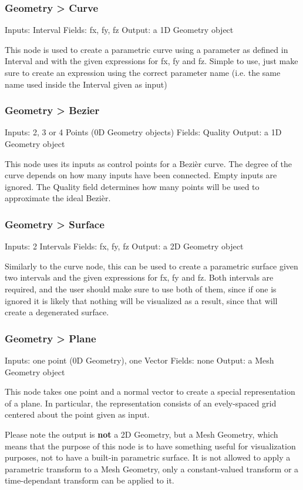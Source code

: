 \subsubsection{Geometry > Curve}
Inputs: Interval
Fields: fx, fy, fz
Output: a 1D Geometry object

This node is used to create a parametric curve using a parameter as defined in
Interval and with the given expressions for fx, fy and fz. Simple to use,
just make sure to create an expression using the correct parameter name
(i.e. the same name used inside the Interval given as input)

\subsubsection{Geometry > Bezier}
Inputs: 2, 3 or 4 Points (0D Geometry objects)
Fields: Quality
Output: a 1D Geometry object

This node uses its inputs as control points for a Bezi\`er curve. The degree of the
curve depends on how many inputs have been connected. Empty inputs are ignored.
The Quality field determines how many points will be used to approximate the ideal
Bezi\`er.

\subsubsection{Geometry > Surface}
Inputs: 2 Intervals
Fields: fx, fy, fz
Output: a 2D Geometry object

Similarly to the curve node, this can be used to create a parametric surface
given two intervals and the given expressions for fx, fy and fz.
Both intervals are required, and the user should make sure to use both of them,
since if one is ignored it is likely that nothing will be visualized as a result,
since that will create a degenerated surface.

\subsubsection{Geometry > Plane}
Inputs: one point (0D Geometry), one Vector
Fields: none
Output: a Mesh Geometry object

This node takes one point and a normal vector to create a special representation
of a plane. In particular, the representation consists of an evely-spaced grid centered
about the point given as input.

Please note the output is \textbf{not} a 2D Geometry, but a Mesh Geometry,
which means that the purpose of this node is to have something useful for
visualization purposes, not to have a built-in parametric surface.
It is not allowed to apply a parametric transform to a Mesh Geometry,
only a constant-valued transform or a time-dependant transform can be applied to it.

